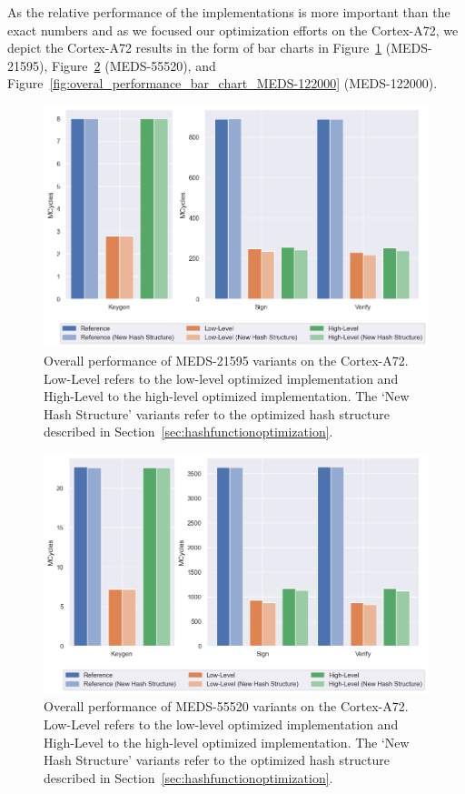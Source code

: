 \documentclass[11pt,a4paper]{report}
\theoremstyle{definition}
\begin{document}
As the relative performance of the implementations is more important than the exact numbers and as we focused our optimization efforts on the Cortex-A72, we depict the Cortex-A72 results in the form of bar charts in Figure~\ref{fig:overal_performance_bar_chart_MEDS-21595} (MEDS-21595), Figure~\ref{fig:overal_performance_bar_chart_MEDS-55520} (MEDS-55520), and Figure~\ref{fig:overal_performance_bar_chart_MEDS-122000} (MEDS-122000).

\begin{figure}
  \centering
  \includegraphics[width=\textwidth]{plots/barplot_MEDS-21595.png}
  \caption{Overall performance of MEDS-21595 variants on the Cortex-A72. Low-Level refers to the low-level optimized implementation and High-Level to the high-level optimized implementation. The `New Hash Structure' variants refer to the optimized hash structure described in Section~\ref{sec:hashfunctionoptimization}.}
  \label{fig:overal_performance_bar_chart_MEDS-21595}
\end{figure}

\begin{figure}
  \centering
  \includegraphics[width=\textwidth]{plots/barplot_MEDS-55520.png}
  \caption{Overall performance of MEDS-55520 variants on the Cortex-A72. Low-Level refers to the low-level optimized implementation and High-Level to the high-level optimized implementation. The `New Hash Structure' variants refer to the optimized hash structure described in Section~\ref{sec:hashfunctionoptimization}.}
  \label{fig:overal_performance_bar_chart_MEDS-55520}
\end{figure}
\end{document}

